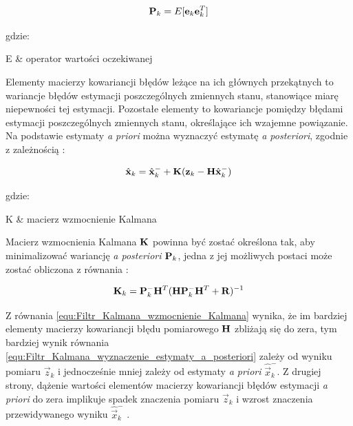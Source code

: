 \begin{equation}
\label{equ:Filtr_Kalmana_macierz_kowariancji_a_posteriori}
	\mathbf{P}_k = E[\mathbf{e}_k \mathbf{e}_k^T]
\end{equation}

\noindent
gdzie:

\begin{conditions}
	E & operator wartości oczekiwanej \\
\end{conditions}

Elementy macierzy kowariancji błędów leżące na ich głównych przekątnych to wariancje błędów estymacji poszczególnych zmiennych stanu, stanowiące miarę niepewności tej estymacji. Pozostałe elementy to kowariancje pomiędzy błędami estymacji poszczególnych zmiennych stanu, określające ich wzajemne powiązanie. Na podstawie estymaty \textit{a priori} można wyznaczyć estymatę \textit{a posteriori}, zgodnie z zależnością \cite{Welch1995}:

\begin{equation}
\label{equ:Filtr_Kalmana_wyznaczenie_estymaty_a_posteriori}
	\hat{\mathbf{x}}_k = \hat{\mathbf{x}}_k^- + \mathbf{K}(\mathbf{z}_k - \mathbf{H}\hat{\mathbf{x}}_k^-)
\end{equation}

\noindent
gdzie:

\begin{conditions}
	K & macierz wzmocnienie Kalmana \\
\end{conditions}

Macierz wzmocnienia Kalmana $\mathbf{K}$ powinna być zostać określona tak, aby minimalizować wariancję \textit{a posteriori} $\mathbf{P}_k$, jedna z jej możliwych postaci może zostać obliczona z równania \cite{Welch1995}:

\begin{equation}
\label{equ:Filtr_Kalmana_wzmocnienie_Kalmana}
	\mathbf{K}_k = \mathbf{P}_k^- \mathbf{H}^T ( \mathbf{H} \mathbf{P}_k^- \mathbf{H}^T +\mathbf{R} ) ^ {-1}
\end{equation}

Z równania \ref{equ:Filtr_Kalmana_wzmocnienie_Kalmana} wynika, że im bardziej elementy macierzy kowariancji błędu pomiarowego $\mathbf{H}$ zbliżają się do zera, tym bardziej wynik równania \ref{equ:Filtr_Kalmana_wyznaczenie_estymaty_a_posteriori} zależy od wyniku pomiaru $\vec{z}_k$ i jednocześnie mniej zależy od estymaty \textit{a priori} $\hat{\vec{x}}_k^-$. Z drugiej strony, dążenie wartości elementów macierzy kowariancji błędów estymacji \textit{a priori} do zera implikuje spadek znaczenia pomiaru $\vec{z}_k$ i wzrost znaczenia przewidywanego wyniku $\hat{\vec{x}}_k^-$ \cite{Welch1995}.

